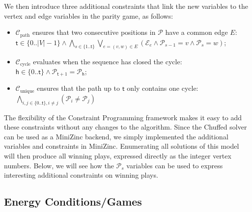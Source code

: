 \documentclass[a4paper,UKenglish,cleveref, autoref, thm-restate, anonymous]{lipics-v2021}
\begin{document}
We then introduce three additional constraints that link the new variables to the vertex and edge variables in the parity game, as follows:

\begin{itemize}
    \item $\mathcal{C}_{\text{path}}$ ensures that two consecutive positions in $\mathcal{P}$ have a common edge $E$:\\
    $\mathsf{t}  \in \{0..\lvert V \rvert -1 \} \wedge  \bigwedge_{s \in \{1.. \mathsf{t}  \}}  \bigvee_{e=(v,w) \in E} (\mathcal{E}_e \wedge \mathcal{P}_{s-1} = v \wedge \mathcal{P}_s = w )$;
    \item $\mathcal{C}_{\text{cycle}}$ evaluates when the sequence has closed the cycle:\\
    $\mathsf{h} \in \{0..\mathsf{t} \} \wedge \mathcal{P}_{\mathsf{t} +1} = \mathcal{P}_\mathsf{h}$;
    \item $\mathcal{C}_{\text{unique}}$ ensures that the path up to $\mathsf{t}$ only contains one cycle:\\
    $\bigwedge_{i,j \in  \{0..\mathsf{t} \}, i \neq j} (\mathcal{P}_i \neq \mathcal{P}_j)$
\end{itemize}

The flexibility of the Constraint Programming framework makes it easy to add these constraints without any changes to the \noc algorithm. Since the Chuffed solver can be used as a MiniZinc backend, we simply implemented the additional variables and constraints in MiniZinc. Enumerating all solutions of this model will then produce all winning plays, expressed directly as the integer vertex numbers. Below, we will see how the $\mathcal{P}_s$ variables can be used to express interesting additional constraints on winning plays.


\subsection{Energy Conditions/Games}
\end{document}
